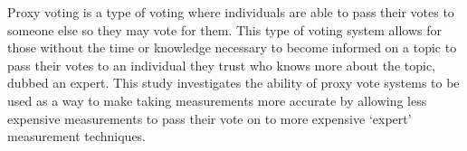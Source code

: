 %
%
%

\begin{publicabstract}

Proxy voting is a type of voting where individuals are able to pass their votes to
someone else so they may vote for them.
This type of voting system allows for those without the time or knowledge necessary
to become informed on a topic to pass their votes to an individual they trust who
knows more about the topic, dubbed an expert.
This study investigates the ability of proxy vote systems to be used as a way to make
taking measurements more accurate by allowing less expensive measurements to pass their
vote on to more expensive `expert' measurement techniques.


\end{publicabstract}


